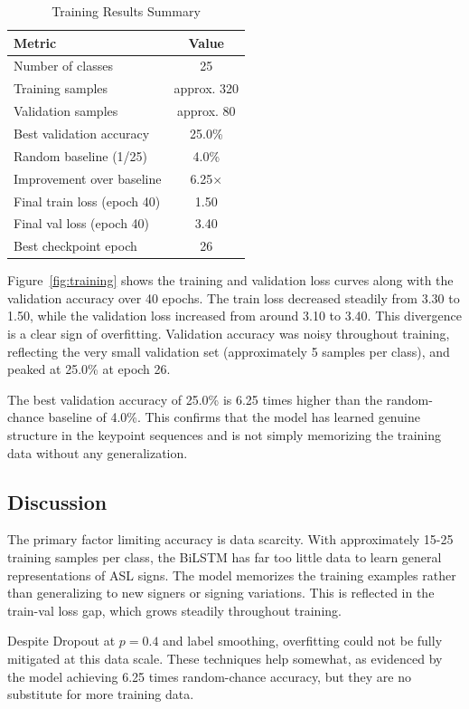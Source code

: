 \documentclass[conference]{IEEEtran}
\begin{document}
\begin{table}[htbp]
\caption{Training Results Summary}
\centering
\begin{tabular}{lc}
\toprule
\textbf{Metric} & \textbf{Value} \\
\midrule
Number of classes & 25 \\
Training samples & approx. 320 \\
Validation samples & approx. 80 \\
Best validation accuracy & 25.0\% \\
Random baseline (1/25) & 4.0\% \\
Improvement over baseline & 6.25$\times$ \\
Final train loss (epoch 40) & 1.50 \\
Final val loss (epoch 40) & 3.40 \\
Best checkpoint epoch & 26 \\
\bottomrule
\end{tabular}
\label{tab:results}
\end{table}

Figure~\ref{fig:training} shows the training and validation loss curves along with the validation accuracy over 40 epochs. The train loss decreased steadily from 3.30 to 1.50, while the validation loss increased from around 3.10 to 3.40. This divergence is a clear sign of overfitting. Validation accuracy was noisy throughout training, reflecting the very small validation set (approximately 5 samples per class), and peaked at 25.0\% at epoch 26.

The best validation accuracy of 25.0\% is 6.25 times higher than the random-chance baseline of 4.0\%. This confirms that the model has learned genuine structure in the keypoint sequences and is not simply memorizing the training data without any generalization.

\subsection{Discussion}

The primary factor limiting accuracy is data scarcity. With approximately 15-25 training samples per class, the BiLSTM has far too little data to learn general representations of ASL signs. The model memorizes the training examples rather than generalizing to new signers or signing variations. This is reflected in the train-val loss gap, which grows steadily throughout training.

Despite Dropout at $p = 0.4$ and label smoothing, overfitting could not be fully mitigated at this data scale. These techniques help somewhat, as evidenced by the model achieving 6.25 times random-chance accuracy, but they are no substitute for more training data.
\end{document}
